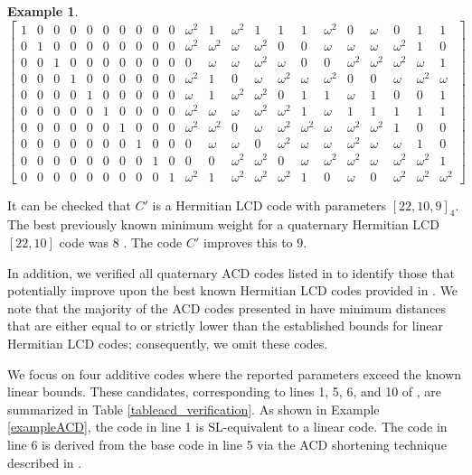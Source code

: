 \documentclass[a4paper,12pt]{article}
\theoremstyle{plain}
\theoremstyle{definition}
\newtheorem{example}{Example}
\begin{document}
\begin{example}
\[ 
\left[
\begin{array}{cccccccccccccccccccccc}
1&0&0&0&0&0&0&0&0&0&\omega^2&1&\omega^2&1&1&1&\omega^2&0&\omega&0&1&1\\
0&1&0&0&0&0&0&0&0&0&\omega^2&\omega^2&\omega&\omega^2&0&0&\omega&\omega&\omega&\omega^2&1&0\\
0&0&1&0&0&0&0&0&0&0&0&\omega&\omega&\omega^2&\omega&0&0&\omega^2&\omega^2&\omega^2&\omega&1\\
0&0&0&1&0&0&0&0&0&0&\omega^2&1&0&\omega&\omega^2&\omega&\omega^2&0&0&\omega&\omega^2&\omega\\
0&0&0&0&1&0&0&0&0&0&\omega&1&\omega^2&\omega^2&0&1&1&\omega&1&0&0&1\\
0&0&0&0&0&1&0&0&0&0&\omega^2&\omega&\omega&\omega^2&\omega^2&1&\omega&1&1&1&1&1\\
0&0&0&0&0&0&1&0&0&0&\omega^2&\omega^2&0&\omega&\omega^2&\omega^2&\omega&\omega^2&\omega^2&1&0&0\\
0&0&0&0&0&0&0&1&0&0&0&\omega&\omega&0&\omega^2&\omega&\omega&\omega^2&\omega&\omega&1&0\\
0&0&0&0&0&0&0&0&1&0&0&0&\omega^2&\omega^2&0&\omega&\omega^2&\omega^2&\omega&\omega^2&\omega^2&1\\
0&0&0&0&0&0&0&0&0&1&\omega^2&1&\omega^2&\omega^2&\omega^2&1&0&\omega&0&\omega^2&\omega^2&\omega^2
\end{array}
\right] 
\] 





It can be checked that $C'$ is a Hermitian LCD code with parameters $[22,10,9]_4$.
The best previously known minimum weight for a quaternary Hermitian LCD $[22,10]$ code was $8$ \cite[Table 6]{araya2024}. 
The code $C'$ improves this to $9$. 
\end{example}


 In addition, we verified  all quaternary ACD codes listed in \cite[Table IV]{guan2023} to identify those that potentially improve upon the best known Hermitian LCD codes provided in \cite[Table 6]{araya2024}. We note that the majority of the ACD codes presented in \cite{guan2023} have  minimum distances that are either equal to or strictly lower than the established bounds for linear Hermitian LCD codes; consequently, we omit these codes.
 
We focus on  four additive codes where the reported parameters exceed the known linear bounds. These candidates, corresponding to lines 1, 5, 6, and 10 of \cite[Table IV]{guan2023}, are summarized in Table \ref{tableacd_verification}. As shown in Example \ref{exampleACD}, the code in line 1 is $\textrm{SL}$-equivalent to a linear code. The code in line 6 is derived from the base code in line 5 via the ACD shortening technique described in \cite[Lemma 10]{guan2023}.
\end{document}
